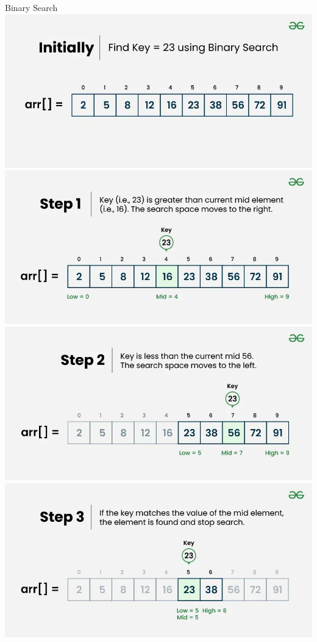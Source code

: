 \documentclass[aspectratio=169,xcolor=dvipsnames]{beamer}
\begin{document}
\begin{frame}{Binary Search}
    \centering
    {\includegraphics[scale=0.4]{images/Binary-Search-1.png} \\
    }
    {\includegraphics[scale=0.4]{images/Binary-Search-2.png} \\
    }
    {\includegraphics[scale=0.4]{images/Binary-Search-3.png} \\
    }
    {\includegraphics[scale=0.4]{images/Binary-Search-4.png} \\
    }
\end{frame}
\end{document}
